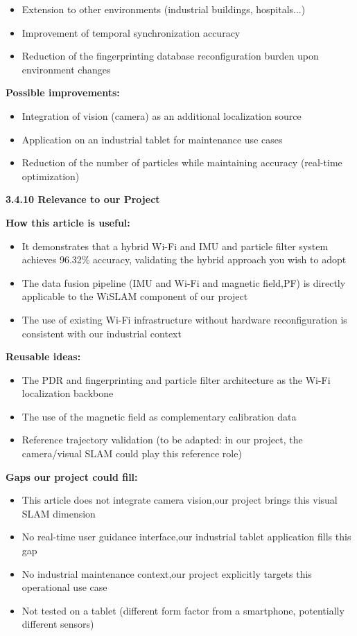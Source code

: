 \documentclass{ipgpmaster}
\begin{document}
\begin{itemize}
    \item Extension to other environments (industrial buildings, hospitals...)
    \item Improvement of temporal synchronization accuracy
    \item Reduction of the fingerprinting database reconfiguration burden upon environment changes
\end{itemize}
\textbf{Possible improvements:}

\begin{itemize}
    \item Integration of vision (camera) as an additional localization source
    \item Application on an industrial tablet for maintenance use cases
    \item Reduction of the number of particles while maintaining accuracy (real-time optimization)
\end{itemize}
 \textbf{3.4.10     Relevance to our Project}

\textbf{How this article is useful:}

\begin{itemize}
    \item It demonstrates that a hybrid Wi-Fi and  IMU and  particle filter system achieves 96.32\% accuracy, validating the hybrid approach you wish to adopt
    \item The data fusion pipeline (IMU and  Wi-Fi and  magnetic field,PF) is directly applicable to the WiSLAM component of our project
    \item The use of existing Wi-Fi infrastructure without hardware reconfiguration is consistent with our industrial context
\end{itemize}
\textbf{Reusable ideas:}

\begin{itemize}
    \item The PDR and  fingerprinting and  particle filter architecture as the Wi-Fi localization backbone
    \item The use of the magnetic field as complementary calibration data
    \item Reference trajectory validation (to be adapted: in our project, the camera/visual SLAM could play this reference role)
\end{itemize}
\textbf{Gaps our project could fill:}

\begin{itemize}
    \item This article does not integrate camera vision,our project brings this visual SLAM dimension
    \item No real-time user guidance interface,our industrial tablet application fills this gap
    \item No industrial maintenance context,our project explicitly targets this operational use case
    \item Not tested on a tablet (different form factor from a smartphone, potentially different sensors)
\end{itemize}
\end{document}
